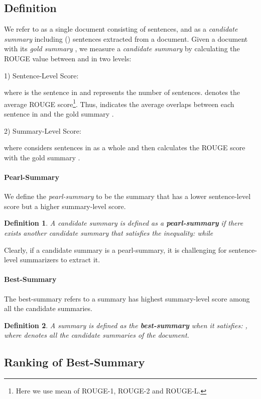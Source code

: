 \documentclass[11pt,a4paper]{article}
\newtheorem{Def}{Definition}
\begin{document}
\subsection{Definition}
We refer to  as a single document consisting of  sentences, and  as a \textit{candidate summary} including  () sentences extracted from a document.
Given a document  with its \textit{gold summary} , we measure a \textit{candidate summary}    by calculating the ROUGE \cite{lin2003automatic} value between   and  in two levels:

1) Sentence-Level Score:

where  is the sentence in  and  represents the number of sentences.  denotes the average ROUGE score\footnote{Here we use mean  of ROUGE-1, ROUGE-2 and ROUGE-L.}.
Thus,  indicates the average overlaps between each sentence in  and the gold summary .


2) Summary-Level Score:

where  considers sentences in  as a whole and then calculates the ROUGE score with the gold summary .




\paragraph{Pearl-Summary}
We define the \textit{pearl-summary} to be the summary that has a lower sentence-level score but a higher summary-level score.
\begin{Def}
A candidate summary  is defined as a \textbf{pearl-summary} if there exists another candidate summary  that satisfies the inequality:
 while

\end{Def}
Clearly, if a candidate summary is a pearl-summary, it is challenging for sentence-level summarizers to extract it.


\paragraph{Best-Summary}

The best-summary refers to a summary has highest summary-level score among all the candidate summaries.
\begin{Def}
A summary  is defined as the \textbf{best-summary} when it satisfies:
, where  denotes all the candidate summaries of the document.
\end{Def}



\subsection{Ranking of Best-Summary}
\label{sec:ranking}
\end{document}
